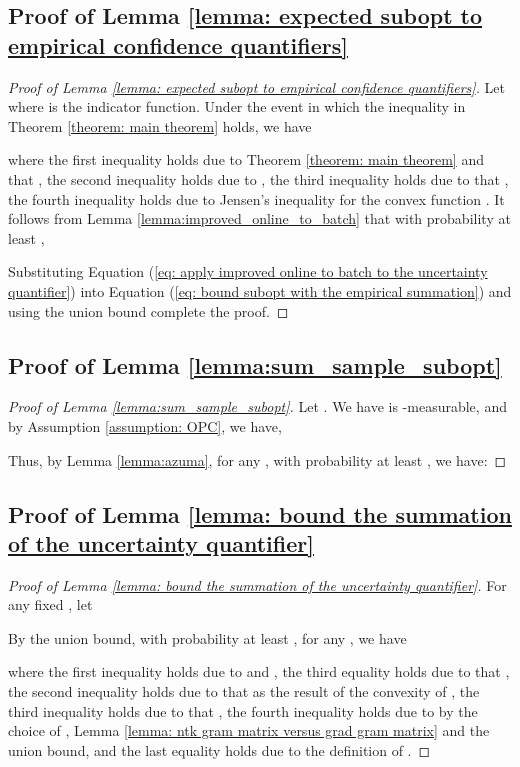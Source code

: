 \documentclass{article} \usepackage{iclr2023/iclr2023_conference,times}
\begin{document}
\subsection{Proof of Lemma \ref{lemma: expected subopt to empirical confidence quantifiers}}
\begin{proof}[Proof of Lemma \ref{lemma: expected subopt to empirical confidence quantifiers}]
Let  where  is the indicator function. Under the event in which the inequality in Theorem \ref{theorem: main theorem} holds, we have 

where the first inequality holds due to Theorem \ref{theorem: main theorem} and that , the second inequality holds due to , the third inequality holds due to that , the fourth inequality holds due to Jensen's inequality for the convex function . It follows from Lemma \ref{lemma:improved_online_to_batch} that with probability at least , 

Substituting Equation (\ref{eq: apply improved online to batch to the uncertainty quantifier}) into Equation (\ref{eq: bound subopt with the empirical summation}) and using the union bound complete the proof.

\end{proof}


\subsection{Proof of Lemma \ref{lemma:sum_sample_subopt}}
\begin{proof}[Proof of Lemma \ref{lemma:sum_sample_subopt}]
Let . We have  is -measurable, and by Assumption \ref{assumption: OPC}, we have, 

Thus, by Lemma \ref{lemma:azuma}, for any , with probability at least , we have: 

\end{proof}

\subsection{Proof of Lemma \ref{lemma: bound the summation of the uncertainty quantifier}}

\begin{proof}[Proof of Lemma \ref{lemma: bound the summation of the uncertainty quantifier}]
For any fixed , let  

By the union bound, with probability at least , for any , we have 

where the first inequality holds due to  and \cite[Lemma~11]{NIPS2011_e1d5be1c}, the third equality holds due to that , the second inequality holds due to that  as the result of the convexity of , the third inequality holds due to that , the fourth inequality holds due to  by the choice of , Lemma \ref{lemma: ntk gram matrix versus grad gram matrix} and the union bound, and the last equality holds due to the definition of . 
\end{proof}
\end{document}
